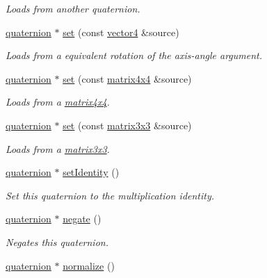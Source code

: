 \begin{DoxyCompactItemize}
\begin{DoxyCompactList}\small\item\em Loads from another quaternion. \end{DoxyCompactList}\item 
\hyperlink{classflounder_1_1quaternion}{quaternion} $\ast$ \hyperlink{classflounder_1_1quaternion_a499ca533df80fe442f7a541c369fa008}{set} (const \hyperlink{classflounder_1_1vector4}{vector4} \&source)
\begin{DoxyCompactList}\small\item\em Loads from a equivalent rotation of the axis-\/angle argument. \end{DoxyCompactList}\item 
\hyperlink{classflounder_1_1quaternion}{quaternion} $\ast$ \hyperlink{classflounder_1_1quaternion_a047888cd985bda85c4707e14b79c17bd}{set} (const \hyperlink{classflounder_1_1matrix4x4}{matrix4x4} \&source)
\begin{DoxyCompactList}\small\item\em Loads from a \hyperlink{classflounder_1_1matrix4x4}{matrix4x4}. \end{DoxyCompactList}\item 
\hyperlink{classflounder_1_1quaternion}{quaternion} $\ast$ \hyperlink{classflounder_1_1quaternion_a35fb76e3f342c7f1f16ae893857b490e}{set} (const \hyperlink{classflounder_1_1matrix3x3}{matrix3x3} \&source)
\begin{DoxyCompactList}\small\item\em Loads from a \hyperlink{classflounder_1_1matrix3x3}{matrix3x3}. \end{DoxyCompactList}\item 
\hyperlink{classflounder_1_1quaternion}{quaternion} $\ast$ \hyperlink{classflounder_1_1quaternion_a109c607ac1b280a9f552afc57cac1df0}{set\+Identity} ()
\begin{DoxyCompactList}\small\item\em Set this quaternion to the multiplication identity. \end{DoxyCompactList}\item 
\hyperlink{classflounder_1_1quaternion}{quaternion} $\ast$ \hyperlink{classflounder_1_1quaternion_a15614edbd2dbb439dafbcab176c16d5b}{negate} ()
\begin{DoxyCompactList}\small\item\em Negates this quaternion. \end{DoxyCompactList}\item 
\hyperlink{classflounder_1_1quaternion}{quaternion} $\ast$ \hyperlink{classflounder_1_1quaternion_a01318feb0c32b259ee5325db9f78fe7e}{normalize} ()

\end{DoxyCompactItemize}
